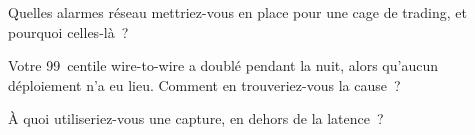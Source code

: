 \begin{interviewq}\label{iq:nw:capturing-and-monitoring-the-network:4}
Quelles alarmes réseau mettriez-vous en place pour une cage de trading, et pourquoi celles-là~?
\end{interviewq}

\begin{interviewq}\label{iq:nw:capturing-and-monitoring-the-network:5}
Votre 99~centile wire-to-wire a doublé pendant la nuit, alors qu'aucun déploiement n'a eu lieu. Comment en trouveriez-vous la cause~?
\end{interviewq}

\begin{interviewq}\label{iq:nw:capturing-and-monitoring-the-network:6}
À quoi utiliseriez-vous une capture, en dehors de la latence~?
\end{interviewq}
